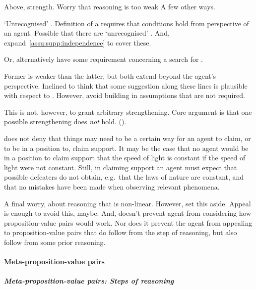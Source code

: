 \begin{note}
  Above, strength.
  Worry that reasoning is too weak
  A few other ways.

  `Unrecognised' .
  Definition of a \requ{} requires that conditions hold from perspective of an agent.
  Possible that there are `unrecognised' .
  And, expand~\autoref{assu:supp:independence} to cover these.

  Or, alternatively have some requirement concerning a search for .

  Former is weaker than the latter, but both extend beyond the agent's perspective.
  Inclined to think that some suggestion along these lines is plausible with respect to \ideaCSB{}.
  However, avoid building in assumptions that are not required.

  This is not, however, to grant arbitrary strengthening.
  Core argument is that one possible strengthening does \emph{not} hold. (\ESU{}).
\end{note}

\begin{note}
  \eiS{} does not deny that things may need to be a certain way for an agent to claim, or to be in a position to, claim support.
  It may be the case that no agent would be in a position to claim support that the speed of light is constant if the speed of light were not constant.
  Still, in claiming support an agent must expect that possible defeaters do not obtain, e.g.\ that the laws of nature are constant, and that no mistakes have been made when observing relevant phenomena.
\end{note}

\begin{note}
  A final worry, about reasoning that is non-linear.
  However, set this aside.
  Appeal is enough to avoid this, maybe.
  And, doesn't prevent agent from considering how proposition-value pairs would work.
  Nor does it prevent the agent from appealing to proposition-value pairs that do follow from the step of reasoning, but also follow from some prior reasoning.
\end{note}

\hozline

\paragraph{Meta-proposition-value pairs}

\subparagraph*{Meta-proposition-value pairs: Steps of reasoning}

